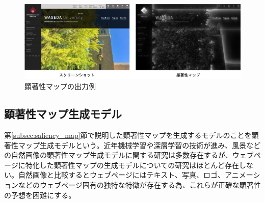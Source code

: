 \begin{figure}[H]
    \centering
    \includegraphics[width=12cm]{figures/example-saliencymap.png}
    \caption{顕著性マップの出力例}
    \label{fig_example-saliencymap}
\end{figure}

\subsection{顕著性マップ生成モデル}
\par 第\ref{subsec:saliency_map}節で説明した顕著性マップを生成するモデルのことを顕著性マップ生成モデルという。近年機械学習や深層学習の技術が進み、風景などの自然画像の顕著性マップ生成モデルに関する研究は多数存在するが、ウェブページに特化した顕著性マップの生成モデルについての研究はほとんど存在しない。自然画像と比較するとウェブページにはテキスト、写真、ロゴ、アニメーションなどのウェブページ固有の独特な特徴が存在する為、これらが正確な顕著性の予想を困難にする。